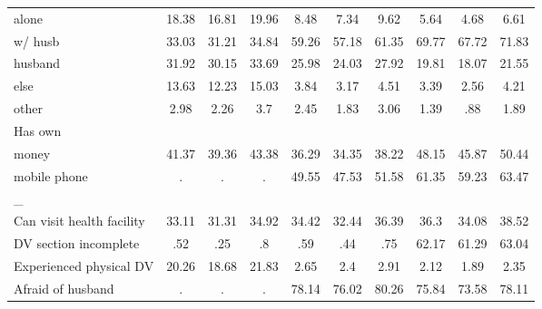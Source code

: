\begin{tabular}{l*{9}{c}}
alone               &       18.38&       16.81&       19.96&        8.48&        7.34&        9.62&        5.64&        4.68&        6.61\\
w/ husb             &       33.03&       31.21&       34.84&       59.26&       57.18&       61.35&       69.77&       67.72&       71.83\\
husband             &       31.92&       30.15&       33.69&       25.98&       24.03&       27.92&       19.81&       18.07&       21.55\\
else                &       13.63&       12.23&       15.03&        3.84&        3.17&        4.51&        3.39&        2.56&        4.21\\
other               &        2.98&        2.26&         3.7&        2.45&        1.83&        3.06&        1.39&         .88&        1.89\\
\midrule
Has own             &            &            &            &            &            &            &            &            &            \\
money               &       41.37&       39.36&       43.38&       36.29&       34.35&       38.22&       48.15&       45.87&       50.44\\
mobile phone        &           .&           .&           .&       49.55&       47.53&       51.58&       61.35&       59.23&       63.47\\
\midrule
\_                   &            &            &            &            &            &            &            &            &            \\
Can visit health facility&       33.11&       31.31&       34.92&       34.42&       32.44&       36.39&        36.3&       34.08&       38.52\\
DV section incomplete&         .52&         .25&          .8&         .59&         .44&         .75&       62.17&       61.29&       63.04\\
Experienced physical DV&       20.26&       18.68&       21.83&        2.65&         2.4&        2.91&        2.12&        1.89&        2.35\\
Afraid of husband   &           .&           .&           .&       78.14&       76.02&       80.26&       75.84&       73.58&       78.11\\
\bottomrule
\end{tabular}
